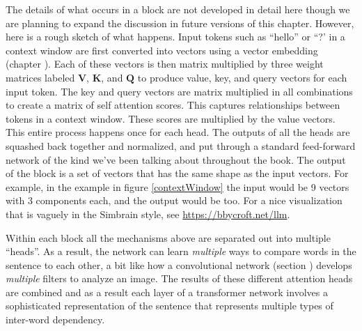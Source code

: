 The details of what occurs in a block are not developed in detail here though we are planning to expand the discussion in future versions of this chapter. However, here is a rough sketch of what happens. Input tokens such as ``hello'' or ``?' in a context window are first converted into vectors using a vector embedding (chapter ). Each of these vectors is then matrix multiplied by three weight matrices labeled $\textbf{V}$, $\textbf{K}$, and $\textbf{Q}$ to produce value, key, and query vectors for each input token. The key and query vectors are matrix multiplied in all combinations to create a matrix of self attention scores. This captures relationships between tokens in a context window. These scores are multiplied by the value vectors. This entire process happens once for each head. The outputs of all the heads are squashed back together and normalized, and put through a standard feed-forward network of the kind we've been talking about throughout the book. The output of the block is a set of vectors that has the same shape as the input vectors.  For example, in the example in figure \ref{contextWindow} the input would be 9 vectors with 3 components each, and the output would be too. For a nice visualization that is vaguely in the Simbrain style, see \url{https://bbycroft.net/llm}.



Within each block all the mechanisms above are separated out into multiple ``heads''. As a result, the network can learn \emph{multiple} ways to compare words in the sentence to each other, a bit like how a convolutional network (section ) develops \emph{multiple} filters to analyze an image.  The results of these different attention heads are combined and as a result each layer of a transformer network involves a sophisticated representation of the sentence that represents multiple types of inter-word dependency.

